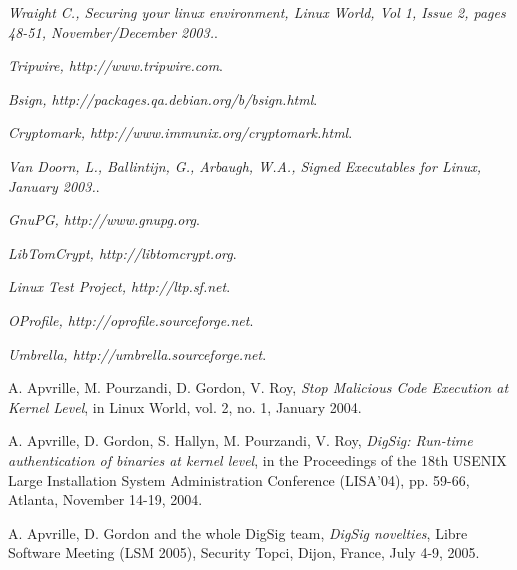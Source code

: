 \documentclass{article}
\begin{document}
\begin{thebibliography}{99}

  {\em Wraight C., Securing your linux environment, Linux World, Vol 1, 
    Issue 2, pages 48-51, November/December 2003.}.

  {\em Tripwire, http://www.tripwire.com}.

  {\em Bsign, http://packages.qa.debian.org/b/bsign.html}. 

  {\em Cryptomark, http://www.immunix.org/cryptomark.html}.

  {\em Van Doorn, L., Ballintijn, G., Arbaugh, W.A., Signed Executables for Linux, January 2003.}.

  {\em GnuPG, http://www.gnupg.org}. 

  {\em LibTomCrypt, http://libtomcrypt.org}.

  {\em Linux Test Project, http://ltp.sf.net}.

  {\em OProfile, http://oprofile.sourceforge.net}. 

  {\em Umbrella, http://umbrella.sourceforge.net}.

  A. Apvrille, M. Pourzandi, D. Gordon, V. Roy, 
  {\em Stop Malicious Code Execution at Kernel Level},
  in Linux World, vol. 2, no. 1, January 2004.

  A. Apvrille, D. Gordon, S. Hallyn, M. Pourzandi, V. Roy,
  {\em DigSig: Run-time authentication of binaries at kernel level},
  in the Proceedings of the 18th USENIX Large Installation System Administration
  Conference (LISA'04), pp. 59-66, Atlanta, November 14-19, 2004.

  A. Apvrille, D. Gordon and the whole DigSig team,
  {\em DigSig novelties}, Libre Software Meeting (LSM 2005), Security Topci,
  Dijon, France, July 4-9, 2005.

\end{thebibliography}
\end{document}

